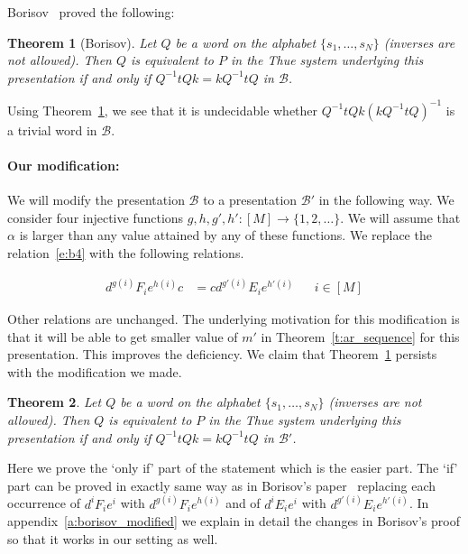 \documentclass[10pt,a4paper]{article}
\newtheorem{theorem}{Theorem}
\theoremstyle{definition}
\theoremstyle{remark}
\newcommand\BB{\mathcal{B}}
\begin{document}
Borisov~\cite[Thm.~1]{borisov69} proved the following:

\begin{theorem}[Borisov]
\label{t:borisov}
  Let $Q$ be a word on the alphabet $\{s_1, \dots, s_N\}$ (inverses are not
  allowed). Then $Q$ is equivalent to $P$ in the Thue system underlying this
  presentation if and only if $Q^{-1}tQk =
  kQ^{-1}tQ$ in $\BB$.
\end{theorem}

Using Theorem~\ref{t:borisov}, we see that it is undecidable whether
$Q^{-1}tQk(kQ^{-1}tQ)^{-1}$ is a
trivial word in $\BB$.

\paragraph{Our modification:} We will modify the presentation $\BB$ to a
presentation $\BB'$ in the following way. We consider four injective 
functions $g,h,g',h' \colon [M] \to \{1, 2, \dots \}$. We will assume that
$\alpha$ is larger than any value attained by any of these functions. 
We
replace the relation~\eqref{e:b4} with the following relations.

\begin{align}
  d^{g(i)}F_ie^{h(i)}c &= cd^{g'(i)}E_ie^{h'(i)} & &i \in [M] \tag{B4'} \label{e:b4'}
\end{align}

Other relations are unchanged. The underlying motivation for this modification
is that it will be able to get smaller value of $m'$ in
Theorem~\ref{t:ar_sequence} for this presentation. This improves the
deficiency. We claim that Theorem~\ref{t:borisov} persists with the modification we
made.

\begin{theorem}
\label{t:B'}
  Let $Q$ be a word on the alphabet $\{s_1, \dots, s_N\}$ (inverses are not
  allowed). Then $Q$ is equivalent to $P$ in the Thue system underlying this
  presentation if and only if $Q^{-1}tQk =
  kQ^{-1}tQ$ in $\BB'$.
\end{theorem}

Here we prove the `only if' part of the statement which is the easier part. The
`if' part can be proved in exactly same way as in Borisov's
paper~\cite{borisov69} replacing each occurrence of $d^i F_i e^i$ with
$d^{g(i)} F_i e^{h(i)}$ and of $d^i E_i e^i$ with $d^{g'(i)} E_i e^{h'(i)}$.
In appendix~\ref{a:borisov_modified} we explain in detail the changes in
Borisov's proof so that it works in our setting as well.
\end{document}
